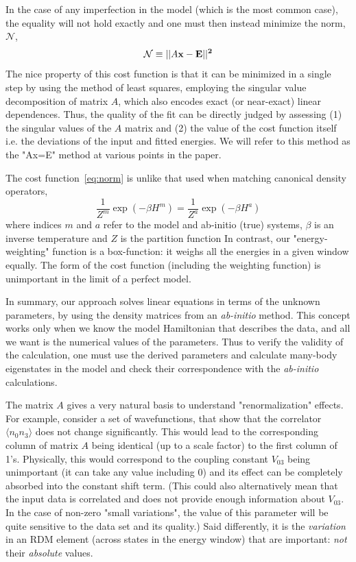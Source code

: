 \documentclass[prl,12pt,onecolumn,nofootinbib,notitlepage,english,superscriptaddress]{revtex4-1}
\newcommand{\HJC}[1]{{\color{RED}{\bf HJC: #1}}}
\begin{document}
In the case of any imperfection in the model (which is the most common case), 
the equality will not hold exactly 
and one must then instead minimize the norm, $\mathcal{N}$,
\begin{equation}
	\mathcal{N} \equiv ||A\bf{x}-\bf{E}||^2
\label{eq:norm}
\end{equation}
The nice property of this cost function is that it can be minimized
in a single step by using the method of least squares, employing the singular 
value decomposition of matrix $A$, which also encodes exact (or near-exact) linear dependences. 
Thus, the quality of the fit can be directly judged 
by assessing (1) the singular values of the $A$ matrix and (2) 
the value of the cost function itself i.e. the deviations of the input and fitted energies.
We will refer to this method as the "Ax=E" method at various points in the paper.

\HJC{Advantage over other cost functions... L1 norm may not be so nice but it could give more minimal models?}
The cost function~\eqref{eq:norm} is unlike that used when matching 
canonical density operators,
\begin{equation} 
\frac{1} {Z^{m}} \exp(-\beta H^{m})  = \frac{1} {Z^{a}} \exp(-\beta H^{a})
\label{eq:Z_Zstar}
\end {equation}
where indices $m$ and $a$ refer to the model and ab-initio (true) systems, $\beta$ 
is an inverse temperature and $Z$ is the partition function
In contrast, our "energy-weighting" function is a box-function: it weighs all the energies 
in a given window equally. The form of the cost function (including the 
weighting function) is unimportant in the limit of a perfect model.

In summary, our approach solves 
linear equations in terms of the unknown parameters, by using the density matrices 
from an \emph{ab-initio} method. This concept works only when we 
know the model Hamiltonian that describes the data, and all we want is the numerical 
values of the parameters. Thus to verify the validity of the calculation, 
one must use the derived parameters and calculate many-body eigenstates 
in the model and check their correspondence with the \emph{ab-initio} 
calculations.

\HJC{What does the A matrix encode - standard tricks of fitting...}
The matrix $A$ gives a very natural basis to understand "renormalization" effects.
For example, consider a set of wavefunctions, that show that the correlator 
$\langle n_0 n_3 \rangle$ does not change significantly. This would lead to the 
corresponding column of matrix $A$ being identical (up to a scale factor) 
to the first column of 1's. Physically, this would correspond to the coupling constant 
$V_{03}$ being unimportant (it can take any value including 0) and its 
effect can be completely absorbed into the constant shift term. 
(This could also alternatively mean that the input 
data is correlated and does not provide enough information about $V_{03}$. 
In the case of non-zero "small variations", the value of this parameter 
will be quite sensitive to the data set and its quality.) 
Said differently, it is the \emph{variation}  
in an RDM element (across states in the energy window) 
that are important: \emph{not} their \emph{absolute} values.
\end{document}
